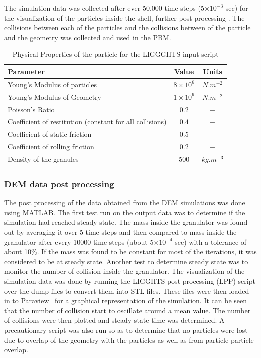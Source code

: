 \documentclass[preprint,11pt,authoryear]{elsarticle}
\begin{document}
The simulation data was collected after ever 50,000 time steps (5$\times 10^{-3}$ sec) 
for the visualization of the particles inside the shell, further post processing . The collisions 
between each of the particles and the collisions between of the particle and the geometry was 
collected and used in the PBM. 

\begin{table}[!htb]%
\caption{Physical Properties of the particle for the LIGGGHTS input script} 
\label{table:mthds_dem_input}
\begin{center}
\begin{tabular}{l|c|c}
\hline
\bf{Parameter} &\bf{Value} &\bf{Units}\\
\hline
Young's Modulus of particles  & $8 \times 10^{6}$ & $N.m^{-2}$\\
Young's Modulus of Geometry  & $1 \times 10^{9}$ & $N.m^{-2}$\\
Poisson's Ratio & $0.2$ & $-$\\
Coefficient of restitution (constant for all collisions) & $0.4$ & $-$\\
Coefficient of static friction & $0.5$ & $-$\\
Coefficient of rolling friction  & $0.2$ & $-$\\
Density of the granules & $500$ & $kg.m^{-3}$\\
\hline
\end{tabular}
\end{center}
\end{table}

\subsubsection{DEM data post processing}
The post processing of the data obtained from the DEM simulations was done using MATLAB. 
The first test run on the output data was to determine if the simulation had reached steady-state. The 
mass inside the granulator was found out by averaging it over 5 time steps and then compared to 
mass inside the granulator after every 10000 time steps (about 5$\times 10^{-4}$ sec) with a 
tolerance of about 10\%. If the mass was found to be constant for most of the iterations, it was 
considered to be at steady state. Another test to determine steady state was to monitor the number of 
collision inside the granulator. The visualization of the simulation data was done by running the 
LIGGHTS post processing (LPP) script over the dump files to convert them into STL files. These 
files were then loaded in to Paraview~\citep{henderson2004} for a graphical representation of the 
simulation. It can be seen that the number of collision start to oscillate around a mean value. The 
number of collisions were then plotted and steady state time was determined.
A precautionary script was also run so as to determine that no particles were lost due to overlap 
of the geometry with the particles as well as from particle particle overlap.
\end{document}
